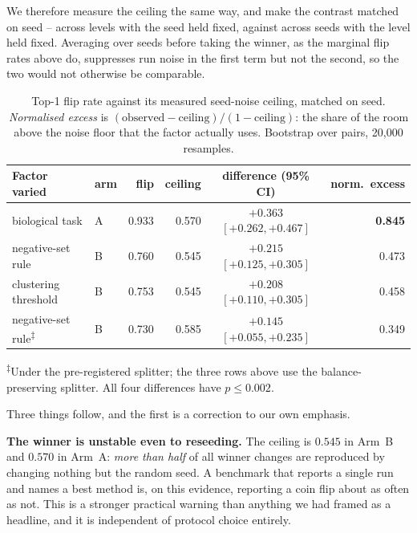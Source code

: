 \documentclass[11pt,a4paper]{article}
\begin{document}
We therefore measure the ceiling the same way, and make the contrast matched on seed --
across levels with the seed held fixed, against across seeds with the level held fixed.
Averaging over seeds before taking the winner, as the marginal flip rates above do,
suppresses run noise in the first term but not the second, so the two would not otherwise
be comparable.

\begin{table}[htbp]\centering\small
\caption{Top-1 flip rate against its measured seed-noise ceiling, matched on seed.
\emph{Normalised excess} is $(\text{observed} - \text{ceiling})/(1 - \text{ceiling})$: the
share of the room above the noise floor that the factor actually uses. Bootstrap over
pairs, 20{,}000 resamples.}
\label{tab:flipceiling}
\begin{tabular}{llrrcr}
\toprule
Factor varied & arm & flip & ceiling & difference (95\% CI) & norm.\ excess \\
\midrule
biological task      & A & 0.933 & 0.570 & ${+}0.363$ $[{+}0.262, {+}0.467]$ & \textbf{0.845} \\
negative-set rule    & B & 0.760 & 0.545 & ${+}0.215$ $[{+}0.125, {+}0.305]$ & 0.473 \\
clustering threshold & B & 0.753 & 0.545 & ${+}0.208$ $[{+}0.110, {+}0.305]$ & 0.458 \\
negative-set rule\textsuperscript{$\ddagger$} & B & 0.730 & 0.585 & ${+}0.145$ $[{+}0.055, {+}0.235]$ & 0.349 \\
\bottomrule
\end{tabular}

\vspace{2pt}
\footnotesize\raggedright
\textsuperscript{$\ddagger$}Under the pre-registered splitter; the three rows above use the
balance-preserving splitter. All four differences have $p \leq 0.002$.
\end{table}

Three things follow, and the first is a correction to our own emphasis.

\textbf{The winner is unstable even to reseeding.} The ceiling is $0.545$ in Arm~B and
$0.570$ in Arm~A: \emph{more than half} of all winner changes are reproduced by changing
nothing but the random seed. A benchmark that reports a single run and names a best method
is, on this evidence, reporting a coin flip about as often as not. This is a stronger
practical warning than anything we had framed as a headline, and it is independent of
protocol choice entirely.
\end{document}
